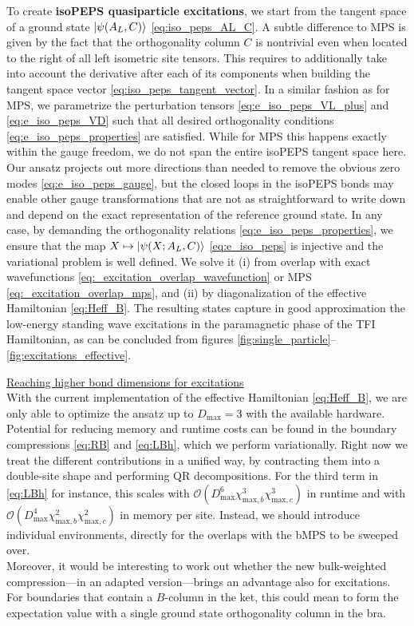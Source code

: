 \begin{enumerate}
To create \textbf{isoPEPS quasiparticle excitations}, we start from the tangent space of a ground state $\ket{\psi(A_L, C)}$ \eqref{eq:iso_peps_AL_C}. A subtle difference to MPS is given by the fact that the orthogonality column $C$ is nontrivial even when located to the right of all left isometric site tensors. This requires to additionally take into account the derivative after each of its components when building the tangent space vector \eqref{eq:iso_peps_tangent_vector}. In a similar fashion as for MPS, we parametrize the perturbation tensors \eqref{eq:e_iso_peps_VL_plus} and \eqref{eq:e_iso_peps_VD} such that all desired orthogonality conditions \eqref{eq:e_iso_peps_properties} are satisfied. While for MPS this happens exactly within the gauge freedom, we do not span the entire isoPEPS tangent space here. Our ansatz projects out more directions than needed to remove the obvious zero modes \eqref{eq:e_iso_peps_gauge}, but the closed loops in the isoPEPS bonds may enable other gauge transformations that are not as straightforward to write down and depend on the exact representation of the reference ground state. In any case, by demanding the orthogonality relations \eqref{eq:e_iso_peps_properties}, we ensure that the map $X \mapsto \ket{\psi(X; A_L, C)}$ \eqref{eq:e_iso_peps} is injective and the variational problem is well defined. We solve it (i) from overlap with exact wavefunctions \eqref{eq:_excitation_overlap_wavefunction} or MPS \eqref{eq:_excitation_overlap_mps}, and (ii) by diagonalization of the effective Hamiltonian \eqref{eq:Heff_B}. The resulting states capture in good approximation the low-energy standing wave excitations in the paramagnetic phase of the TFI Hamiltonian, as can be concluded from figures \ref{fig:single_particle}--\ref{fig:excitations_effective}.
\end{enumerate}


\noindent \underline{Reaching higher bond dimensions for excitations} \\[0.5em]
With the current implementation of the effective Hamiltonian \eqref{eq:Heff_B}, we are only able to optimize the ansatz up to $D_{\text{max}} = 3$ with the available hardware. Potential for reducing memory and runtime costs can be found in the boundary compressions \eqref{eq:RB} and \eqref{eq:LBh}, which we perform variationally. Right now we treat the different contributions in a unified way, by contracting them into a double-site shape and performing QR decompositions. For the third term in \eqref{eq:LBh} for instance, this scales with $\mathcal{O}( D_{\text{max}}^6 \chi_{\text{max}, b}^3 \chi_{\text{max}, c}^3)$ in runtime and with $\mathcal{O}( D_{\text{max}}^4 \chi_{\text{max}, b}^2 \chi_{\text{max}, c}^2)$ in memory per site. Instead, we should introduce individual environments, directly for the overlaps with the bMPS to be sweeped over. \\
Moreover, it would be interesting to work out whether the new bulk-weighted compression---in an adapted version---brings an advantage also for excitations. For boundaries that contain a $B$-column in the ket, this could mean to form the expectation value with a single ground state orthogonality column in the bra. \\[1em]

